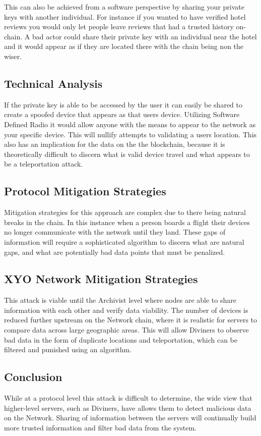 \documentclass{article}
\begin{document}
This can also be achieved from a software perspective by sharing your private keys with another individual. For instance if you wanted to have verified hotel reviews you would only let people leave reviews that had a trusted history on-chain. A bad actor could share their private key with an individual near the hotel and it would appear as if they are located there with the chain being non the wiser. 

\subsection{Technical Analysis}
If the private key is able to be accessed by the user it can easily be shared to create a spoofed device that appears as that users device. Utilizing Software Defined Radio it would allow anyone with the means to appear to the network as your specific device. This will nullify attempts to validating a users location. This also has an implication for the data on the the blockchain, because it is theoretically difficult to discern what is valid device travel and what appears to be a teleportation attack. 

\subsection{Protocol Mitigation Strategies}
Mitigation strategies for this approach are complex due to there being natural breaks in the chain. In this instance when a person boards a flight their devices no longer communicate with the network until they land. These gaps of information will require a sophisticated algorithm to discern what are natural gaps, and what are potentially bad data points that must be penalized. 

\subsection{XYO Network Mitigation Strategies}
This attack is viable until the Archivist level where nodes are able to share information with each other and verify data viability. The number of devices is reduced further upstream on the Network chain, where it is realistic for servers to compare data across large geographic areas. This will allow Diviners to observe bad data in the form of duplicate locations and teleportation, which can be filtered and punished using an algorithm. 

\subsection{Conclusion}
While at a protocol level this attack is difficult to determine, the wide view that higher-level servers, such as Diviners, have allows them to detect malicious data on the Network. Sharing of information between the servers will continually build more trusted information and filter bad data from the system.
\end{document}
